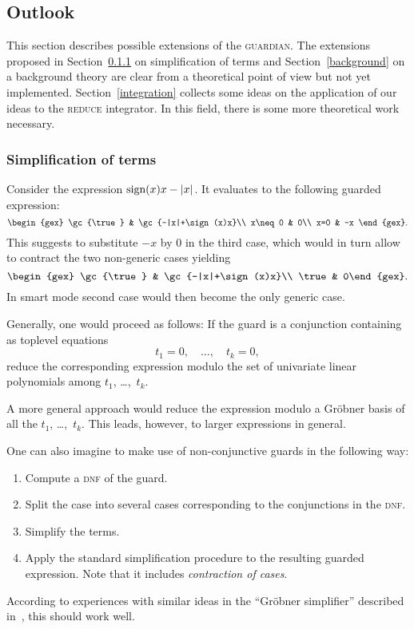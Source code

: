\subsection{Outlook}
This section describes possible extensions of the \textsc{guardian}. The
extensions proposed in Section~\ref{simplification} on simplification
of terms and Section~\ref{background} on a background theory are clear
from a theoretical point of view but not yet implemented.
Section~\ref{integration} collects some ideas on the application of
our ideas to the \textsc{reduce} integrator. In this field, there is some
more theoretical work necessary.
%
\subsubsection{Simplification of terms}\label{simplification}
Consider the expression $\textrm{sign}(x)x-|x|$. It evaluates to the following
guarded expression:
$$
\begin{gex}
\gc{\true} & \gc{-|x|+\sign(x)x}\\
x\neq 0 & 0\\
x=0 & -x
\end{gex}.
$$
This suggests to substitute $-x$ by $0$ in the third case, which would
in turn allow to contract the two non-generic cases yielding
$$
\begin{gex}
\gc{\true} & \gc{-|x|+\sign(x)x}\\
\true & 0\end{gex}.
$$
In smart mode second case would then become the only generic case.

Generally, one would proceed as follows: If the guard is a conjunction
containing as toplevel equations
$$
t_1=0,\quad \dots,\quad t_k=0,
$$
reduce the corresponding expression modulo the set of univariate
linear polynomials among $t_1$, \dots,~$t_k$.

A more general approach would reduce the expression modulo a Gr\"obner
basis of all the $t_1$, \dots,~$t_k$. This leads, however, to larger
expressions in general.

One can also imagine to make use of non-conjunctive guards in the
following way:
\begin{enumerate}
\item Compute a \textsc{dnf} of the guard.
\item Split the case into several cases corresponding to the
conjunctions in the \textsc{dnf}.
\item Simplify the terms.
\item Apply the standard simplification procedure to the resulting
guarded expression. Note that it includes {\em contraction of cases}.
\end{enumerate}
According to experiences with similar ideas in the ``Gr\"obner
simplifier'' described in~\cite{DolzmannSturm:95}, this should work
well.
%
